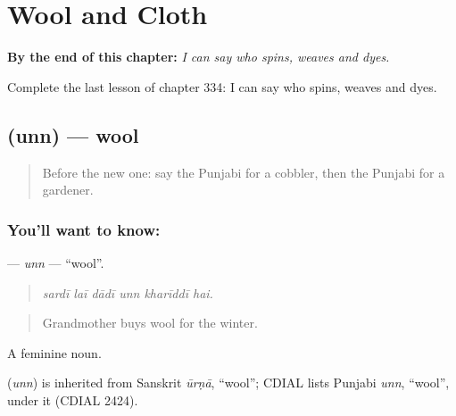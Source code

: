
\chapter{Wool and Cloth}
\label{ch:pa-a2-wool-and-cloth}

\begin{chapteropening}
\textbf{By the end of this chapter:} \emph{I can say who spins, weaves and dyes.}

Complete the last lesson of chapter 334: I can say who spins, weaves and dyes.
\end{chapteropening}

\section[\texorpdfstring{\pa{ਉੱਨ} (unn)}{ਉੱਨ (unn)}]{ (unn) — wool}

\label{lesson:PA-C334-unn}



\begin{quote}
Before the new one: say the Punjabi for a cobbler, then the Punjabi for a gardener.
\end{quote}

\subsection*{You'll want to know: }
\textbf{} — \emph{unn} — \textquotedblleft{}wool\textquotedblright{}.

\begin{quote}
     
\end{quote}

\begin{quote}
\emph{sardī laī dādī unn kharīddī hai.}
\end{quote}

\begin{quote}
Grandmother buys wool for the winter.
\end{quote}

A feminine noun.

\begin{cousinweb}
\textbf{} (\emph{unn}) is inherited from Sanskrit \emph{ūrṇā}, \textquotedblleft{}wool\textquotedblright{}; CDIAL lists Punjabi \emph{unn}, \textquotedblleft{}wool\textquotedblright{}, under it (CDIAL 2424).
\end{cousinweb}

